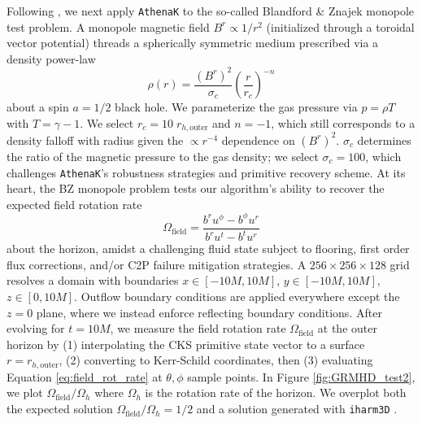 \documentclass[twocolumn, floatfix]{aastex63}
\newcommand{\ak}{\texttt{AthenaK}}
\begin{document}
Following \cite{2024MNRAS.532.3198C}, we next apply \ak{} to the so-called Blandford \& Znajek \citep[BZ;][]{1977MNRAS.179..433B} monopole test problem.  A monopole magnetic field $B^r \propto 1/r^2$ (initialized through a toroidal vector potential) threads a spherically symmetric medium prescribed via a density power-law
\begin{equation}
\rho(r) = \frac{\left( B^r \right) ^2}{\sigma_c} \left( \frac{r}{r_c} \right)^{-n}
\end{equation}
about a spin $a = 1/2$ black hole.  We parameterize the gas pressure via $p = \rho T$ with $T = \gamma - 1$.  We select $r_c = 10 \; r_{h, \mathrm{outer}}$ and $n = -1$, which still corresponds to a density falloff with radius given the $\propto r^{-4}$ dependence on $\left( B^r \right) ^2$.   $\sigma_c$ determines the ratio of the magnetic pressure to the gas density; we select $\sigma_c = 100$, which challenges \ak{}'s robustness strategies and primitive recovery scheme.   At its heart, the BZ monopole problem tests our algorithm's ability to recover the expected field rotation rate
\begin{equation}
    \Omega_\mathrm{field} = \frac{b^r u^\phi - b^\phi u^r }{b^r u^t - b^t u^r}
\label{eq:field_rot_rate}
\end{equation}
about the horizon, amidst a challenging fluid state subject to flooring, first order flux corrections, and/or C2P failure mitigation strategies.  A $256 \times 256 \times 128$ grid resolves a domain with boundaries $x \in [-10M, 10M]$, $y \in [-10M, 10M]$, $z \in [0, 10M]$. Outflow boundary conditions are applied everywhere except the $z=0$ plane, where we instead enforce reflecting boundary conditions.  After evolving for $t = 10M$, we measure the field rotation rate $\Omega_\mathrm{field}$ at the outer horizon by (1) interpolating the CKS primitive state vector to a surface $r = r_{h, \mathrm{outer}}$, (2) converting to Kerr-Schild coordinates, then (3) evaluating Equation \ref{eq:field_rot_rate} at $\theta, \phi$ sample points.  In Figure \ref{fig:GRMHD_test2}, we plot $\Omega_\mathrm{field} / \Omega_h$ where $\Omega_h$ is the rotation rate of the horizon.  We overplot both the expected solution $\Omega_\mathrm{field} / \Omega_h = 1/2$ and a solution generated with \texttt{iharm3D} \citep{2021JOSS....6.3336P}.
 
\end{document}
